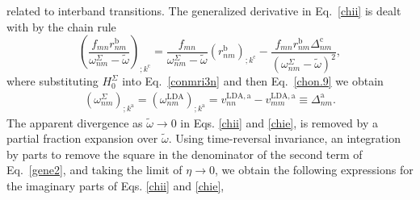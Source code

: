 \documentclass[floatfix,prb,aps,superscriptaddress,showpacs,11pt,preprint,letterpaper]{revtex4}
\begin{document}
related to interband transitions.
The generalized derivative in Eq.~\eqref{chii} is dealt with by the chain rule 
\begin{equation}\label{gene2}
\left(\frac{f_{mn}r_{nm}^{\mathrm{b}}}{\omega^\Sigma_{nm}-\tilde\omega}\right)_{;k^{\mathrm{c}}}=
\frac{f_{mn}}{\omega^\Sigma_{nm}-\tilde\omega}\left(r_{nm}^\mathrm{b}\right)_{;k^{\mathrm{c}}}
-\frac{f_{mn}r_{nm}^{\mathrm{b}}\Delta_{nm}^\mathrm{c}}{(\omega^\Sigma_{nm}-\tilde\omega)^2}
,
\end{equation}
where substituting $H^\Sigma_0$ 
into Eq.~\eqref{conmri3n} and then
Eq.~\eqref{chon.9}
we obtain
\begin{align}\label{eli.13}
\left(\omega^\Sigma_{nm}\right)_{;k^{\mathrm{a}}}
=
\left(\omega^\mathrm{LDA}_{nm}\right)_{;k^{\mathrm{a}}}
= 
v_{nn}^{\mathrm{LDA},\mathrm{a}}-v_{mm}^{\mathrm{LDA},\mathrm{a}}\equiv\Delta_{nm}^{\mathrm{a}}
.
\end{align} 
The apparent divergence as $\tilde\omega\to 0$
in Eqs. \eqref{chii} and \eqref{chie},  
is removed  by
 a partial fraction expansion over $\tilde\omega$. 
Using time-reversal invariance, an integration by parts to 
remove the square in the denominator of the second term of Eq.~\eqref{gene2}, 
and taking the limit of $\eta\to 0$, 
we obtain the following expressions for the imaginary parts of 
Eqs. \eqref{chii} and \eqref{chie}, 
\end{document}
